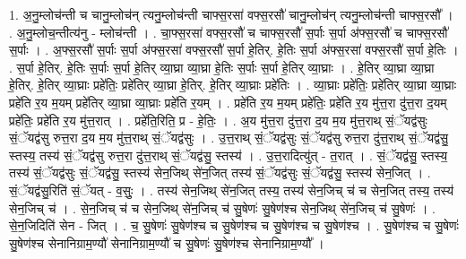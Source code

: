 \documentclass[17pt]{extarticle}
\begin{document}
1. अ॒नु॒म्लोच॑न्ती च चानु॒म्लोच॑न् त्यनु॒म्लोच॑न्ती चाफ्स॒रसा॑ वफ्स॒रसौ॑ चानु॒म्लोच॑न् त्यनु॒म्लोच॑न्ती चाफ्स॒रसौ᳚ । . अ॒नु॒म्लोच॒न्तीत्य॑नु - म्लोच॑न्ती । . चा॒फ्स॒रसा॑ वफ्स॒रसौ॑ च चाफ्स॒रसौ॑ स॒र्पाः स॒र्पा अ॑फ्स॒रसौ॑ च चाफ्स॒रसौ॑ स॒र्पाः । . अ॒फ्स॒रसौ॑ स॒र्पाः स॒र्पा अ॑फ्स॒रसा॑ वफ्स॒रसौ॑ स॒र्पा हे॒तिर्. हे॒तिः स॒र्पा अ॑फ्स॒रसा॑ वफ्स॒रसौ॑ स॒र्पा हे॒तिः । . स॒र्पा हे॒तिर्. हे॒तिः स॒र्पाः स॒र्पा हे॒तिर् व्या॒घ्रा व्या॒घ्रा हे॒तिः स॒र्पाः स॒र्पा हे॒तिर् व्या॒घ्राः । . हे॒तिर् व्या॒घ्रा व्या॒घ्रा हे॒तिर्. हे॒तिर् व्या॒घ्राः प्रहे॑तिः॒ प्रहे॑तिर् व्या॒घ्रा हे॒तिर्. हे॒तिर् व्या॒घ्राः प्रहे॑तिः । . व्या॒घ्राः प्रहे॑तिः॒ प्रहे॑तिर् व्या॒घ्रा व्या॒घ्राः प्रहे॑ति र॒य म॒यम् प्रहे॑तिर् व्या॒घ्रा व्या॒घ्राः प्रहे॑ति र॒यम् । . प्रहे॑ति र॒य म॒यम् प्रहे॑तिः॒ प्रहे॑ति र॒य मु॑त्त॒रा दु॑त्त॒रा द॒यम् प्रहे॑तिः॒ प्रहे॑ति र॒य मु॑त्त॒रात् । . प्रहे॑ति॒रिति॒ प्र - हे॒तिः॒ । . अ॒य मु॑त्त॒रा दु॑त्त॒रा द॒य म॒य मु॑त्त॒राथ् सं॒ॅयद्व॑सुः सं॒ॅयद्व॑सु रुत्त॒रा द॒य म॒य मु॑त्त॒राथ् सं॒ॅयद्व॑सुः । . उ॒त्त॒राथ् सं॒ॅयद्व॑सुः सं॒ॅयद्व॑सु रुत्त॒रा दु॑त्त॒राथ् सं॒ॅयद्व॑सु॒ स्तस्य॒ तस्य॑ सं॒ॅयद्व॑सु रुत्त॒रा दु॑त्त॒राथ् सं॒ॅयद्व॑सु॒ स्तस्य॑ । . उ॒त्त॒रादित्यु॑त् - त॒रात् । . सं॒ॅयद्व॑सु॒ स्तस्य॒ तस्य॑ सं॒ॅयद्व॑सुः सं॒ॅयद्व॑सु॒ स्तस्य॑ सेन॒जिथ् से॑न॒जित् तस्य॑ सं॒ॅयद्व॑सुः सं॒ॅयद्व॑सु॒ स्तस्य॑ सेन॒जित् । . सं॒ॅयद्व॑सु॒रिति॑ सं॒ॅयत् - व॒सुः॒ । . तस्य॑ सेन॒जिथ् से॑न॒जित् तस्य॒ तस्य॑ सेन॒जिच् च॑ च सेन॒जित् तस्य॒ तस्य॑ सेन॒जिच् च॑ । . से॒न॒जिच् च॑ च सेन॒जिथ् से॑न॒जिच् च॑ सु॒षेणः॑ सु॒षेण॑श्च सेन॒जिथ् से॑न॒जिच् च॑ सु॒षेणः॑ । . से॒न॒जिदिति॑ सेन - जित् । . च॒ सु॒षेणः॑ सु॒षेण॑श्च च सु॒षेण॑श्च च सु॒षेण॑श्च च सु॒षेण॑श्च । . सु॒षेण॑श्च च सु॒षेणः॑ सु॒षेण॑श्च सेनानिग्राम॒ण्यौ॑ सेनानिग्राम॒ण्यौ॑ च सु॒षेणः॑ सु॒षेण॑श्च सेनानिग्राम॒ण्यौ᳚ । \newline
\end{document}
